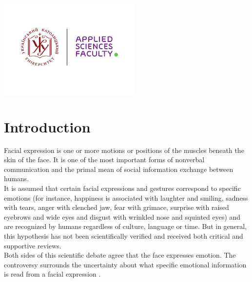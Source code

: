 \begin{titlepage}

\includegraphics[height=5cm]{UCU-Apps.png}\\[1cm] %
 

\vfill %

\end{titlepage}


	

\section{Introduction}

Facial expression is one or more motions or positions of the muscles beneath the skin of the face. It is one of the most important forms of nonverbal communication and the primal mean of social information exchange between humans.\\

It is assumed that certain facial expressions and gestures correspond to specific emotions (for instance, happiness is associated with laughter and smiling, sadness with tears, anger with clenched jaw, fear with grimace, surprise with raised eyebrows and wide eyes and disgust with wrinkled nose and squinted eyes) and are recognized by humans regardless of culture, language or time. But in general, this hypothesis has not been scientifically verified and received both critical and supportive reviews.\\

Both sides of this scientific debate agree that the face expresses emotion. The controversy surrounds the uncertainty about what specific emotional information is read from a facial expression \cite{wiki}.


